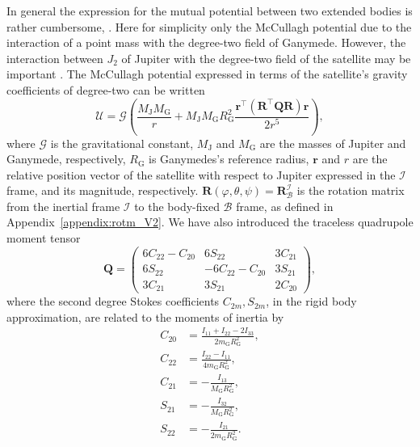 \documentclass[lineno, pdflatex,sn-mathphys-ay]{sn-jnl}
\theoremstyle{thmstyleone}%
\theoremstyle{thmstyletwo}%
\theoremstyle{thmstylethree}%
\renewcommand{\vec}[1]{\boldsymbol{#1}}
\begin{document}
In general the expression for the mutual potential between two extended bodies is rather cumbersome, \citep[see, e.g.,][]{1978CeMec..18..295B, Tricarico2008CeMDA.100..319T}. Here for simplicity  only the McCullagh potential due to the interaction of  a point mass with the degree-two field of Ganymede. 
However, the interaction between $J_2$ of Jupiter with the degree-two field of the satellite may be important \citep[see, e.g.,][]{1981M&P....25....3E}. 
The McCullagh potential expressed in terms of the satellite's gravity coefficients of degree-two can be written 
%
\begin{equation}\label{potential_1b_approx_stokes_V2}
	\mathcal{U} = 	\mathcal{G}
	\left(
	\frac{M_{\mathrm{J}} {M}_{\mathrm{G}}}{r} 
	+ M_{\mathrm{J}} {M}_{\mathrm{G}} R_\mathrm{G}^2 \frac{
		 \vec{r}^\top \left( 
	\vec{R}^\top \vec{Q} \vec{R}
		\right) \vec{r}}{2 r^5}
	 \right),
\end{equation}
%
where $\mathcal{G}$ is the gravitational constant,  $M_{\mathrm{J}}$ and ${M}_{\mathrm{G}}$ are the masses of Jupiter and Ganymede, respectively, $R_{\mathrm{G}}$ is Ganymedes's reference radius, 
$\vec{r}$ and $r$ are the relative position vector of the satellite with respect to Jupiter expressed in the $\mathcal{I}$ frame, and its magnitude, respectively.   
${\vec{R}(\varphi,\theta,\psi) = \vec{R}_{\mathcal{B}}^{\mathcal{I}}}$
is the rotation matrix from the inertial frame $\mathcal{I}$ to the body-fixed $\mathcal{B}$ frame, as defined in Appendix~\ref{appendix:rotm_V2}. 
We have also introduced the traceless quadrupole moment tensor \citep[e.g.,][]{Marchenko2001}
%
\begin{equation}
	\label{eq:def_Q_gravity_coeffs_V2}
	\vec{Q}  = 
	\begin{pmatrix}
		6C_{22} -C_{20} & 6 S_{22}& 3C_{21} \\
	6 S_{22}	& -6C_{22} - C_{20} & 3S_{21}  \\
	3C_{21}	&3S_{21}  & 2C_{20}
	\end{pmatrix}, 
\end{equation}
%
where the second degree Stokes coefficients $C_{2m}, S_{2m}$, in the rigid body approximation, are related to the moments of inertia by
%
\begin{subequations}
	\label{eq:inertia2stokes_V2}
\begin{align}
	\label{eq:inertia2stokes_V2_C20_V2}
	C_{20}  &= \frac{I_{11} + I_{22} - 2 I_{33} }{2{m}_\mathrm{G}R_\mathrm{G}^2}, \\ %
	\label{eq:inertia2stokes_V2_C22_V2}
	C_{22}  &= \frac{I_{22} - I_{11}  }{4{m}_\mathrm{G}R_\mathrm{G}^2}, \\
	\label{eq:inertia2stokes_V2_C21_S21_S22_V2}
	C_{21}  &=-  \frac{ I_{13} }{{M}_{\mathrm{G}}R_\mathrm{G}^2}, \\%
	S_{21}  &=-  \frac{ I_{32} }{{M}_{\mathrm{G}}R_\mathrm{G}^2}, \\%
	S_{22}  &=-  \frac{ I_{21} }{2{m}_\mathrm{G}R_\mathrm{G}^2}. 
\end{align}
\end{subequations}
\end{document}
